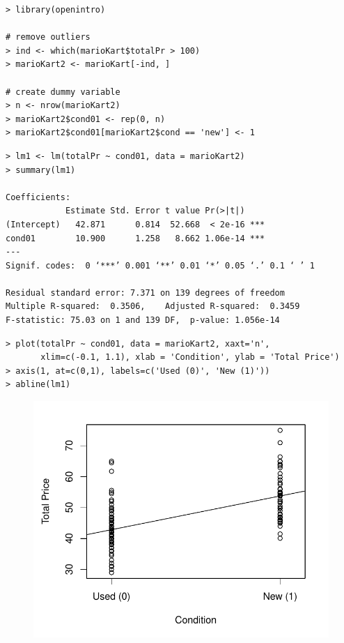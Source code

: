 \documentclass[10pt]{beamer}
\begin{document}
\begin{frame}[fragile]
\small
\begin{verbatim}
> library(openintro)

# remove outliers
> ind <- which(marioKart$totalPr > 100)
> marioKart2 <- marioKart[-ind, ]

# create dummy variable
> n <- nrow(marioKart2)
> marioKart2$cond01 <- rep(0, n)
> marioKart2$cond01[marioKart2$cond == 'new'] <- 1
\end{verbatim}
\end{frame}

\begin{frame}[fragile]
\small
\begin{verbatim}
> lm1 <- lm(totalPr ~ cond01, data = marioKart2)
> summary(lm1)

Coefficients:
            Estimate Std. Error t value Pr(>|t|)    
(Intercept)   42.871      0.814  52.668  < 2e-16 ***
cond01        10.900      1.258   8.662 1.06e-14 ***
---
Signif. codes:  0 ‘***’ 0.001 ‘**’ 0.01 ‘*’ 0.05 ‘.’ 0.1 ‘ ’ 1

Residual standard error: 7.371 on 139 degrees of freedom
Multiple R-squared:  0.3506,	Adjusted R-squared:  0.3459 
F-statistic: 75.03 on 1 and 139 DF,  p-value: 1.056e-14
\end{verbatim}
\end{frame}

\begin{frame}[fragile]
\small
\begin{verbatim}
> plot(totalPr ~ cond01, data = marioKart2, xaxt='n', 
       xlim=c(-0.1, 1.1), xlab = 'Condition', ylab = 'Total Price')
> axis(1, at=c(0,1), labels=c('Used (0)', 'New (1)'))
> abline(lm1)
\end{verbatim}

\begin{figure}
\includegraphics[scale=0.5]{figure/price_cond.pdf}
\end{figure}
\end{frame}
\end{document}
